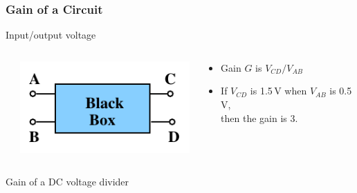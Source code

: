 \documentclass[beamer]{standalone}
\begin{document}
\begin{frame}[t]
 \frametitle{Gain of a Circuit}
 \begin{block}{Input/output voltage}
  \begin{columns}
   \begin{column}{0.0\textwidth}
   \end{column}
   \begin{column}{0.35\textwidth}
    \includegraphics[width=\textwidth]{pics/Black_box}
   \end{column}
   \begin{column}{0.65\textwidth}
    \begin{itemize}
     \item Gain $G$ is $V_{CD} / V_{AB}$
     \item If $V_{CD}$ is 1.5\,V when $V_{AB}$ is 0.5\,V, \\ then the gain is 3.
    \end{itemize}
   \end{column}
  \end{columns}
 \end{block}
 \begin{block}{Gain of a DC voltage divider}
  \begin{columns}
   \begin{column}{0.0\textwidth}
   \end{column}
   \begin{column}{0.2\textwidth}

\end{column}
\end{columns}
\end{block}
\end{frame}
\end{document}
